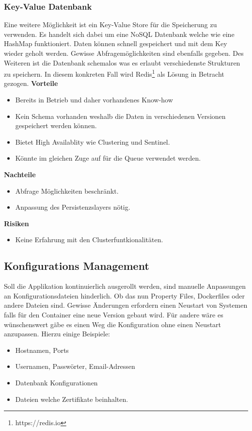 \subsubsection{Key-Value Datenbank}

Eine weitere Möglichkeit ist ein Key-Value Store für die Speicherung zu verwenden. Es handelt sich dabei um eine \gls{NoSQL} Datenbank welche wie eine HashMap funktioniert. Daten können schnell gespeichert und mit dem Key wieder geholt werden. Gewisse Abfragemöglichkeiten sind ebenfalls gegeben. Des Weiteren ist die Datenbank schemalos was es erlaubt verschiedenste Strukturen zu speichern. In diesem konkreten Fall wird Redis\footnote{https://redis.io} als Lösung in Betracht gezogen. \newline
\newline
\textbf{Vorteile}
\begin{itemize}
	\item Bereits in Betrieb und daher vorhandenes Know-how
	\item Kein Schema vorhanden weshalb die Daten in verschiedenen Versionen gespeichert werden können.
	\item Bietet High Availablity wie Clustering und Sentinel.
	\item Könnte im gleichen Zuge auf für die Queue verwendet werden.	
\end{itemize}
\textbf{Nachteile}
\begin{itemize}
	\item Abfrage Möglichkeiten beschränkt.
	\item Anpassung des Persistenzslayers nötig.
\end{itemize}
\textbf{Risiken}
\begin{itemize}
	\item Keine Erfahrung mit den Clusterfuntkionalitäten.
\end{itemize}

\subsection{Konfigurations Management}

Soll die Applikation kontinuierlich ausgerollt werden, sind manuelle Anpassungen an Konfigurationsdateien hinderlich. Ob das nun Property Files, Dockerfiles oder andere Dateien sind. Gewisse Änderungen erfordern einen Neustart von Systemen falls für den Container eine neue Version gebaut wird. Für andere wäre es wünschenswert gäbe es einen Weg die Konfiguration ohne einen Neustart anzupassen. Hierzu einige Beispiele:\newline
\begin{itemize}
	\item Hostnamen, Ports
	\item Usernamen, Passwörter, Email-Adressen
	\item Datenbank Konfigurationen
	\item Dateien welche Zertifikate beinhalten.
\end{itemize}

